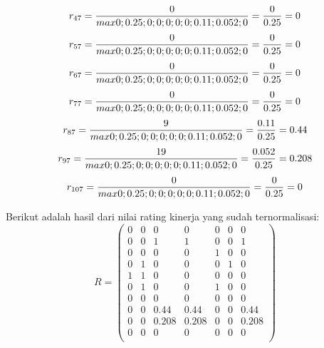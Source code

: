 \begin{enumerate}
\begin{displaymath}
r_{47} = \frac{0}{max {0;0.25;0;0;0;0;0;0.11;0.052;0}} = \frac{0}{0.25} = 0\\
\end {displaymath}
\begin{displaymath}
r_{57} = \frac{0}{max {0;0.25;0;0;0;0;0;0.11;0.052;0}} = \frac{0}{0.25} = 0\\
\end {displaymath}
\begin{displaymath}
r_{67} = \frac{0}{max {0;0.25;0;0;0;0;0;0.11;0.052;0}} = \frac{0}{0.25} = 0\\
\end {displaymath}
\begin{displaymath}
r_{77} = \frac{0}{max {0;0.25;0;0;0;0;0;0.11;0.052;0}} = \frac{0}{0.25} = 0\\
\end {displaymath}
\begin{displaymath}
r_{87} = \frac{9}{max {0;0.25;0;0;0;0;0;0.11;0.052;0}} = \frac{0.11}{0.25} = 0.44\\
\end {displaymath}
\begin{displaymath}
r_{97} = \frac{19}{max {0;0.25;0;0;0;0;0;0.11;0.052;0}} = \frac{0.052}{0.25} = 0.208\\
\end {displaymath}
\begin{displaymath}
r_{107} = \frac{0}{max {0;0.25;0;0;0;0;0;0.11;0.052;0}} = \frac{0}{0.25} = 0\\
\end {displaymath}
\end{enumerate}

Berikut adalah hasil dari nilai rating kinerja yang sudah ternormalisasi:
\begin{displaymath} R = 
\left (
\begin{array}{rrrrrrr}
0 & 0 & 0 & 0 & 0 & 0 & 0\\		
0 & 0 & 1 & 1 & 0 & 0 & 1\\
0 & 0 & 0 & 0 & 1 & 0 & 0\\
0 & 1 & 0 & 0 & 0 & 1 & 0\\
1 & 1 & 0 & 0 & 0 & 0 & 0\\
0 & 1 & 0 & 0 & 1 & 0 & 0\\
0 & 0 & 0 & 0 & 0 & 0 & 0\\
0 & 0 & 0.44 & 0.44 & 0 & 0 & 0.44\\
0 & 0 & 0.208 & 0.208 & 0 & 0 & 0.208\\
0 & 0 & 0 & 0 & 0 & 0 & 0\\
			\end{array}\right )	
	\end{displaymath}


